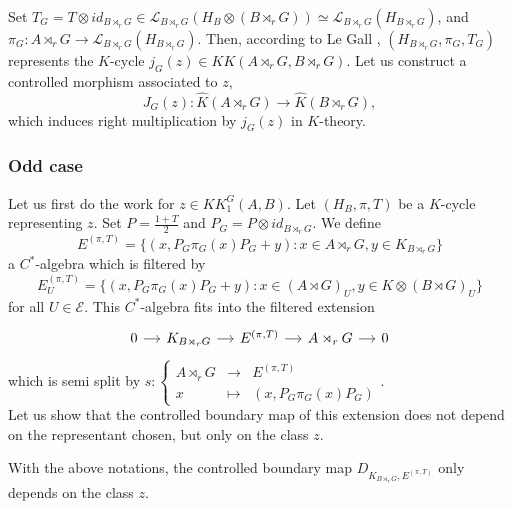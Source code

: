 Set $T_G= T\otimes id_{B\rtimes_r G}\in \mathcal L_{B\rtimes_r G}(H_B\otimes (B\rtimes_r G))\simeq \mathcal L_{B\rtimes_r G}(H_{B\rtimes_r G})$, and $\pi_G: A\rtimes_r G \rightarrow \mathcal L_{B\rtimes_r G}(H_{B\rtimes_r G})$. Then, according to Le Gall \cite{LeGall}, $(H_{B\rtimes_r G}, \pi_G, T_G)$ represents the $K$-cycle $j_G(z)\in KK(A\rtimes_r G,B\rtimes_r G)$. Let us construct a controlled morphism associated to $z$,
\[J_G(z) : \hat K(A\rtimes_r G)\rightarrow \hat K(B\rtimes_r G), \]
which induces right multiplication by $j_G(z)$ in $K$-theory.

\subsubsection{Odd case}

Let us first do the work for $z\in KK_1^G(A,B)$. Let $(H_B,\pi,T)$ be a $K$-cycle representing $z$. Set $P=\frac{1+T}{2}$ and $P_G=P\otimes id_{B\rtimes_r G}$. We define
\[E^{(\pi,T)}=\{(x,P_G\pi_G(x)P_G + y) : x\in A\rtimes_r G, y\in K_{B\rtimes_r G}\}\]
a $C^*$-algebra which is filtered by
\[E_U^{(\pi,T)}=\{(x,P_G\pi_G(x)P_G + y) : x\in (A\rtimes G)_U, y\in K\otimes (B\rtimes G)_U\}\]
for all $U\in\mathcal E$. This $C^*$-algebra fits into the filtered extension
\[\begin{tikzcd}[column sep = small]
0\arrow{r} & K_{B\rtimes_r G}\arrow{r} & E^{(\pi,T)} \arrow{r} & A\rtimes_r G \arrow{r}& 0
\end{tikzcd}\]
which is semi split by  $s :\left\{\begin{array}{lll}A\rtimes_r G & \rightarrow & E^{(\pi,T)} \\ x & \mapsto & (x, P_G \pi_G(x)P_G)\end{array}\right.$.\\

Let us show that the controlled boundary map of this extension does not depend on the representant chosen, but only on the class $z$.

\begin{lem} With the above notations, the controlled boundary map $D_{K_{B\rtimes_r G},E^{(\pi,T)}}$ only depends on the class $z$.
\end{lem}

